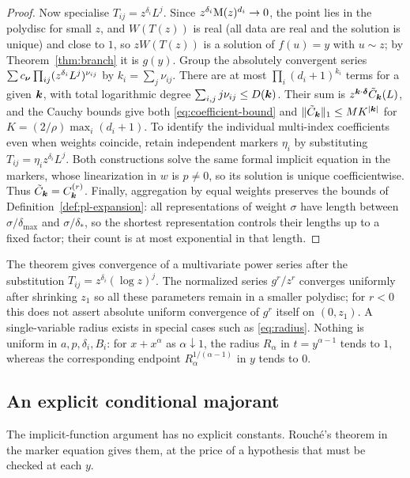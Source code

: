 \begin{proof}
Now specialise $T_{ij}=z^{\delta_i}L^j$. Since $z^{\delta_i}\mathrm M(z)^{d_i}\to0$, the point lies in the polydisc for small $z$, and $W(T(z))$ is real (all data are real and the solution is unique) and close to $1$, so $zW(T(z))$ is a solution of $f(u)=y$ with $u\sim z$; by Theorem~\ref{thm:branch} it is $g(y)$. Group the absolutely convergent series $\sum c_{\boldsymbol\nu}\prod_{ij}(z^{\delta_i}L^j)^{\nu_{ij}}$ by $k_i=\sum_j\nu_{ij}$. There are at most $\prod_i(d_i+1)^{k_i}$ terms for a given $\boldsymbol k$, with total logarithmic degree $\sum_{i,j}j\nu_{ij}\le D(\boldsymbol k)$. Their sum is $z^{\boldsymbol k\cdot\boldsymbol\delta}\tilde C_{\boldsymbol k}(L)$, and the Cauchy bounds give both \eqref{eq:coefficient-bound} and $\|\tilde C_{\boldsymbol k}\|_1\le M K^{|\boldsymbol k|}$ for $K=(2/\rho)\max_i(d_i+1)$. To identify the individual multi-index coefficients even when weights coincide, retain independent markers $\eta_i$ by substituting $T_{ij}=\eta_i z^{\delta_i}L^j$. Both constructions solve the same formal implicit equation in the markers, whose linearization in $w$ is $p\ne0$, so its solution is unique coefficientwise. Thus $\tilde C_{\boldsymbol k}=C^{(r)}_{\boldsymbol k}$. Finally, aggregation by equal weights preserves the bounds of Definition~\ref{def:pl-expansion}: all representations of weight $\sigma$ have length between $\sigma/\delta_{\max}$ and $\sigma/\delta_*$, so the shortest representation controls their lengths up to a fixed factor; their count is at most exponential in that length.
\end{proof}

\begin{remark}
The theorem gives convergence of a multivariate power series after the substitution $T_{ij}=z^{\delta_i}(\log z)^j$. The normalized series $g^r/z^r$ converges uniformly after shrinking $z_1$ so all these parameters remain in a smaller polydisc; for $r<0$ this does not assert absolute uniform convergence of $g^r$ itself on $(0,z_1)$. A single-variable radius exists in special cases such as \eqref{eq:radius}. Nothing is uniform in $a,p,\delta_i,B_i$: for $x+x^\alpha$ as $\alpha\downarrow1$, the radius $R_\alpha$ in $t=y^{\alpha-1}$ tends to $1$, whereas the corresponding endpoint $R_\alpha^{1/(\alpha-1)}$ in $y$ tends to $0$.
\end{remark}

\subsection{An explicit conditional majorant}

The implicit-function argument has no explicit constants. Rouch\'e's theorem in the marker equation gives them, at the price of a hypothesis that must be checked at each $y$.

